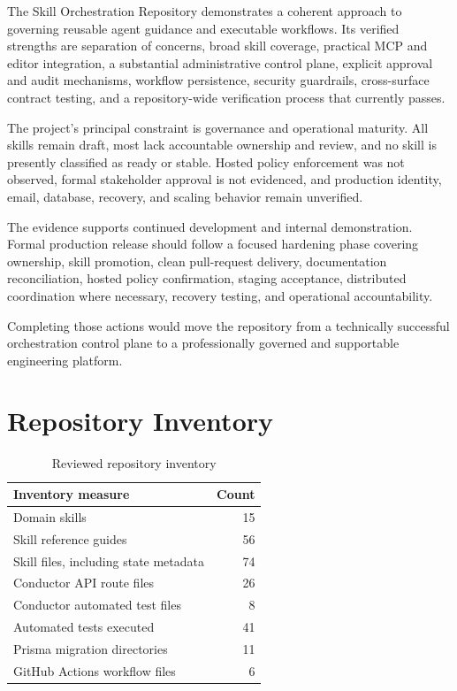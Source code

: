 \documentclass[12pt]{report}
\begin{document}
The Skill Orchestration Repository demonstrates a coherent approach to governing reusable agent guidance and executable workflows. Its verified strengths are separation of concerns, broad skill coverage, practical MCP and editor integration, a substantial administrative control plane, explicit approval and audit mechanisms, workflow persistence, security guardrails, cross-surface contract testing, and a repository-wide verification process that currently passes.

The project's principal constraint is governance and operational maturity. All skills remain draft, most lack accountable ownership and review, and no skill is presently classified as ready or stable. Hosted policy enforcement was not observed, formal stakeholder approval is not evidenced, and production identity, email, database, recovery, and scaling behavior remain unverified.

The evidence supports continued development and internal demonstration. Formal production release should follow a focused hardening phase covering ownership, skill promotion, clean pull-request delivery, documentation reconciliation, hosted policy confirmation, staging acceptance, distributed coordination where necessary, recovery testing, and operational accountability.

Completing those actions would move the repository from a technically successful orchestration control plane to a professionally governed and supportable engineering platform.

\appendix

\chapter{Repository Inventory}

\begin{table}[hbt!]
\centering
\begin{tabular}{lr}
\toprule
Inventory measure & Count \\
\midrule
Domain skills & 15 \\
Skill reference guides & 56 \\
Skill files, including state metadata & 74 \\
Conductor API route files & 26 \\
Conductor automated test files & 8 \\
Automated tests executed & 41 \\
Prisma migration directories & 11 \\
GitHub Actions workflow files & 6 \\
\bottomrule
\end{tabular}
\caption{Reviewed repository inventory}
\label{tab:inventory}
\end{table}
\end{document}
